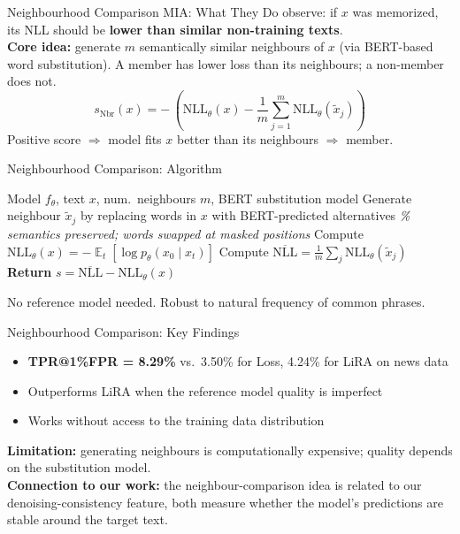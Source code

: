 \documentclass[10pt, aspectratio=169]{beamer}
\DeclareMathOperator*{\E}{\mathbb{E}}
\newcommand{\NLL}{\mathrm{NLL}}
\begin{document}

\begin{frame}{Neighbourhood Comparison MIA: What They Do}
  \citet{mattern2023mia} observe: if $x$ was memorized, its NLL should be \textbf{lower than similar non-training texts}.\\[8pt]
  \textbf{Core idea:} generate $m$ semantically similar neighbours of $x$ (via BERT-based word substitution).
  A member has lower loss than its neighbours; a non-member does not.
  \[
    s_{\mathrm{Nbr}}(x) = -\,\left(\NLL_\theta(x) - \frac{1}{m}\sum_{j=1}^{m}\NLL_\theta(\tilde x_j)\right)
  \]
  Positive score $\Rightarrow$ model fits $x$ better than its neighbours $\Rightarrow$ member.
\end{frame}

\begin{frame}{Neighbourhood Comparison: Algorithm}
  \begin{algorithmic}[1]
    \Require Model $f_\theta$, text $x$, num.\ neighbours $m$, BERT substitution model
      \State Generate neighbour $\tilde x_j$ by replacing words in $x$ with BERT-predicted alternatives
      \quad \textit{\% semantics preserved; words swapped at masked positions}
    \EndFor
    \State Compute $\NLL_\theta(x) = -\E_t[\log p_\theta(x_0 \mid x_t)]$
    \State Compute $\overline{\NLL} = \frac{1}{m}\sum_j \NLL_\theta(\tilde x_j)$
    \State \textbf{Return} $s = \overline{\NLL} - \NLL_\theta(x)$
  \end{algorithmic}
  \vspace{6pt}
  No reference model needed. Robust to natural frequency of common phrases.
\end{frame}

\begin{frame}{Neighbourhood Comparison: Key Findings}
  \begin{itemize}
    \item \textbf{TPR@1\%FPR = 8.29\%} vs.\ 3.50\% for Loss, 4.24\% for LiRA on news data
    \item Outperforms LiRA when the reference model quality is imperfect
    \item Works without access to the training data distribution
  \end{itemize}
  \vspace{8pt}
  \textbf{Limitation:} generating neighbours is computationally expensive; quality depends on the substitution model.\\[8pt]
  \textbf{Connection to our work:} the neighbour-comparison idea is related to our denoising-consistency feature, both measure whether the model's predictions are stable around the target text.
\end{frame}
\end{document}
